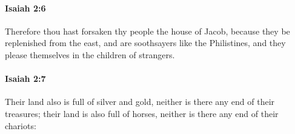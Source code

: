 		\paragraph{Isaiah 2:6} %
			\label{ISAIAH-2-6}

			Therefore thou hast forsaken thy people the house of Jacob, because they be replenished from the east, and are soothsayers like the Philistines, and they please themselves in the children of strangers.


		\paragraph{Isaiah 2:7} %
			\label{ISAIAH-2-7}

			Their land also is full of silver and gold, neither is there any end of their treasures; their land is also full of horses, neither is there any end of their chariots:


